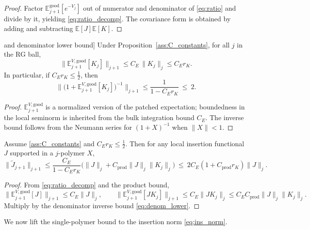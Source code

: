 \begin{proof}
Factor $\mathbb E^{\mathrm{good}}_{j+1}[e^{-V_j}]$ out of numerator and denominator of \eqref{eq:ratio} and divide by it, yielding \eqref{eq:ratio_decomp}.
The covariance form is obtained by adding and subtracting $\mathbb E[J]\mathbb E[K]$.
\end{proof}

\begin{lemma}[Bound on $\mathbb E^{V,\mathrm{good}}_{j+1}[K_j$] and denominator lower bound]\label{lem:denom}
Under Proposition~\ref{ass:C_constants}, for all $j$ in the RG ball,
\[
\big\|\mathbb E^{V,\mathrm{good}}_{j+1}[K_j]\big\|_{j+1}\le C_E\,\|K_j\|_j\le C_E r_K.
\]
In particular, if $C_E r_K\le \tfrac12$, then
\begin{equation}\label{eq:denom_lower}
\Big\|\big(1+\mathbb E^{V,\mathrm{good}}_{j+1}[K_j]\big)^{-1}\Big\|_{j+1}\le \frac{1}{1-C_E r_K}\ \le\ 2.
\end{equation}
\end{lemma}

\begin{proof}
$\mathbb E^{V,\mathrm{good}}_{j+1}$ is a normalized version of the patched expectation; boundedness in the local seminorm is inherited from the bulk integration bound $C_E$.
The inverse bound follows from the Neumann series for $(1+X)^{-1}$ when $\|X\|<1$.
\end{proof}

\begin{lemma}\label{lem:local_bound}
Assume \ref{ass:C_constants} and $C_E r_K\le \tfrac12$. Then for any local insertion functional $J$ supported in a $j$-polymer $X$,
\[
\|\widetilde J_{j+1}\|_{j+1}
\le
\frac{C_E}{1-C_E r_K}\Big(\|J\|_j + C_{\mathrm{prod}}\|J\|_j\|K_j\|_j\Big)
\ \le\ 2C_E(1+C_{\mathrm{prod}}r_K)\|J\|_j.
\]
\end{lemma}

\begin{proof}
From \eqref{eq:ratio_decomp} and the product bound,
\[
\|\mathbb E^{V,\mathrm{good}}_{j+1}[J]\|_{j+1}\le C_E\|J\|_j,\qquad
\|\mathbb E^{V,\mathrm{good}}_{j+1}[J K_j]\|_{j+1}\le C_E\|J K_j\|_j\le C_E C_{\mathrm{prod}}\|J\|_j\|K_j\|_j.
\]
Multiply by the denominator inverse bound \eqref{eq:denom_lower}.
\end{proof}

We now lift the single-polymer bound to the insertion norm \eqref{eq:ins_norm}.

